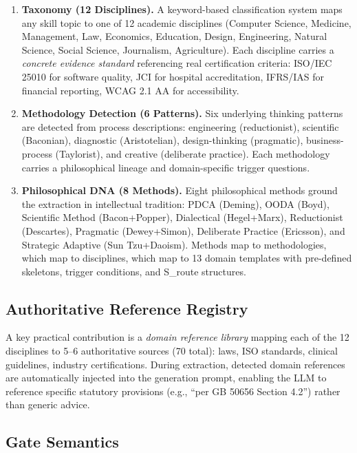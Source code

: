 \documentclass[11pt]{article}
\begin{document}
\begin{enumerate}[leftmargin=*,nosep]
    \item \textbf{Taxonomy (12 Disciplines).} A keyword-based classification system maps any skill topic to one of 12 academic disciplines (Computer Science, Medicine, Management, Law, Economics, Education, Design, Engineering, Natural Science, Social Science, Journalism, Agriculture). Each discipline carries a \textit{concrete evidence standard} referencing real certification criteria: ISO/IEC 25010 for software quality, JCI for hospital accreditation, IFRS/IAS for financial reporting, WCAG 2.1 AA for accessibility.
    \item \textbf{Methodology Detection (6 Patterns).} Six underlying thinking patterns are detected from process descriptions: engineering (reductionist), scientific (Baconian), diagnostic (Aristotelian), design-thinking (pragmatic), business-process (Taylorist), and creative (deliberate practice). Each methodology carries a philosophical lineage and domain-specific trigger questions.
    \item \textbf{Philosophical DNA (8 Methods).} Eight philosophical methods ground the extraction in intellectual tradition: PDCA (Deming), OODA (Boyd), Scientific Method (Bacon+Popper), Dialectical (Hegel+Marx), Reductionist (Descartes), Pragmatic (Dewey+Simon), Deliberate Practice (Ericsson), and Strategic Adaptive (Sun Tzu+Daoism). Methods map to methodologies, which map to disciplines, which map to 13 domain templates with pre-defined skeletons, trigger conditions, and S\_route structures.
\end{enumerate}

\subsection{Authoritative Reference Registry}

A key practical contribution is a \textit{domain reference library} mapping each of the 12 disciplines to 5--6 authoritative sources (70 total): laws, ISO standards, clinical guidelines, industry certifications. During extraction, detected domain references are automatically injected into the generation prompt, enabling the LLM to reference specific statutory provisions (e.g., ``per GB 50656 Section 4.2'') rather than generic advice.

\subsection{Gate Semantics}
\end{document}
